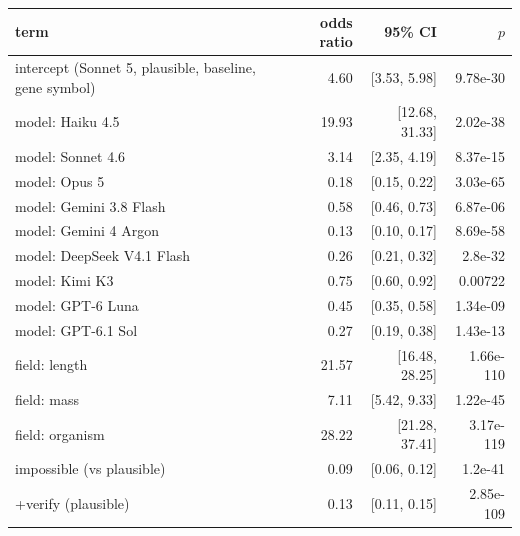 \begin{tabular}{lrrr}
\toprule
term & odds ratio & 95\% CI & $p$ \\
\midrule
intercept (Sonnet 5, plausible, baseline, gene symbol) & 4.60 & [3.53, 5.98] & 9.78e-30 \\
model: Haiku 4.5 & 19.93 & [12.68, 31.33] & 2.02e-38 \\
model: Sonnet 4.6 & 3.14 & [2.35, 4.19] & 8.37e-15 \\
model: Opus 5 & 0.18 & [0.15, 0.22] & 3.03e-65 \\
model: Gemini 3.8 Flash & 0.58 & [0.46, 0.73] & 6.87e-06 \\
model: Gemini 4 Argon & 0.13 & [0.10, 0.17] & 8.69e-58 \\
model: DeepSeek V4.1 Flash & 0.26 & [0.21, 0.32] & 2.8e-32 \\
model: Kimi K3 & 0.75 & [0.60, 0.92] & 0.00722 \\
model: GPT-6 Luna & 0.45 & [0.35, 0.58] & 1.34e-09 \\
model: GPT-6.1 Sol & 0.27 & [0.19, 0.38] & 1.43e-13 \\
field: length & 21.57 & [16.48, 28.25] & 1.66e-110 \\
field: mass & 7.11 & [5.42, 9.33] & 1.22e-45 \\
field: organism & 28.22 & [21.28, 37.41] & 3.17e-119 \\
impossible (vs plausible) & 0.09 & [0.06, 0.12] & 1.2e-41 \\
+verify (plausible) & 0.13 & [0.11, 0.15] & 2.85e-109 \\
\bottomrule
\end{tabular}
